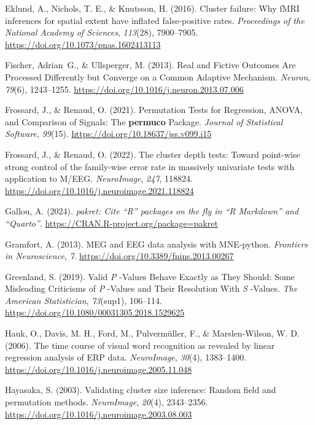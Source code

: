 \documentclass[
  doc,
  floatsintext,
  longtable,
  a4paper,
  nolmodern,
  notxfonts,
  notimes,
  colorlinks=true,linkcolor=blue,citecolor=blue,urlcolor=blue]{apa7}
\newlength{\cslhangindent}
\newenvironment{CSLReferences}[2] %
 {\begin{list}{}{%
  \setlength{\itemindent}{0pt}
  \setlength{\leftmargin}{0pt}
  \setlength{\parsep}{0pt}
  \ifodd #1
   \setlength{\leftmargin}{\cslhangindent}
   \setlength{\itemindent}{-1\cslhangindent}
  \fi
  \setlength{\itemsep}{#2\baselineskip}}}
 {\end{list}}
\begin{document}
\begin{CSLReferences}{1}{0}
Eklund, A., Nichols, T. E., \& Knutsson, H. (2016). Cluster failure: Why
fMRI inferences for spatial extent have inflated false-positive rates.
\emph{Proceedings of the National Academy of Sciences}, \emph{113}(28),
7900--7905. \url{https://doi.org/10.1073/pnas.1602413113}

Fischer, Adrian~G., \& Ullsperger, M. (2013). Real and Fictive Outcomes
Are Processed Differently but Converge on a Common Adaptive Mechanism.
\emph{Neuron}, \emph{79}(6), 1243--1255.
\url{https://doi.org/10.1016/j.neuron.2013.07.006}

Frossard, J., \& Renaud, O. (2021). Permutation Tests for Regression,
ANOVA, and Comparison of Signals: The {\textbf{permuco}} Package.
\emph{Journal of Statistical Software}, \emph{99}(15).
\url{https://doi.org/10.18637/jss.v099.i15}

Frossard, J., \& Renaud, O. (2022). The cluster depth tests: Toward
point-wise strong control of the family-wise error rate in massively
univariate tests with application to M/EEG. \emph{NeuroImage},
\emph{247}, 118824.
\url{https://doi.org/10.1016/j.neuroimage.2021.118824}

Gallou, A. (2024). \emph{{pakret}: Cite {``{R}''} packages on the fly in
{``{R Markdown}''} and {``{Quarto}''}}.
\url{https://CRAN.R-project.org/package=pakret}

Gramfort, A. (2013). MEG and EEG data analysis with MNE-python.
\emph{Frontiers in Neuroscience}, \emph{7}.
\url{https://doi.org/10.3389/fnins.2013.00267}

Greenland, S. (2019). Valid {\emph{P}} -Values Behave Exactly as They
Should: Some Misleading Criticisms of {\emph{P}} -Values and Their
Resolution With {\emph{S}} -Values. \emph{The American Statistician},
\emph{73}(sup1), 106--114.
\url{https://doi.org/10.1080/00031305.2018.1529625}

Hauk, O., Davis, M. H., Ford, M., Pulvermüller, F., \& Marslen-Wilson,
W. D. (2006). The time course of visual word recognition as revealed by
linear regression analysis of ERP data. \emph{NeuroImage}, \emph{30}(4),
1383--1400. \url{https://doi.org/10.1016/j.neuroimage.2005.11.048}

Hayasaka, S. (2003). Validating cluster size inference: Random field and
permutation methods. \emph{NeuroImage}, \emph{20}(4), 2343--2356.
\url{https://doi.org/10.1016/j.neuroimage.2003.08.003}


\end{CSLReferences}
\end{document}
